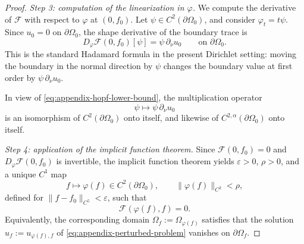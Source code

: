\documentclass[a4paper,11pt,reqno]{amsart}
\numberwithin{equation}{section}
\theoremstyle{plain} %
\theoremstyle{definition} %
\theoremstyle{remark}
\begin{document}
\begin{proof}
\medskip
\noindent\emph{Step 3: computation of the linearization in \(\varphi\).}
We compute the derivative of \(\mathcal F\) with respect to \(\varphi\) at
\((0,f_0)\). Let \(\psi\in C^2(\partial\Omega_0)\), and consider
\(\varphi_t=t\psi\). Since \(u_0=0\) on \(\partial\Omega_0\), the shape derivative
of the boundary trace is
\[
D_\varphi \mathcal F(0,f_0)[\psi]
=
\psi\,\partial_\nu u_0
\qquad \text{on }\partial\Omega_0.
\]
This is the standard Hadamard formula in the present Dirichlet setting: moving
the boundary in the normal direction by \(\psi\) changes the boundary value at
first order by \(\psi\,\partial_\nu u_0\).

In view of \eqref{eq:appendix-hopf-lower-bound}, the multiplication operator
\[
\psi\mapsto \psi\,\partial_\nu u_0
\]
is an isomorphism of \(C^2(\partial\Omega_0)\) onto itself, and likewise of
\(C^{2,\alpha}(\partial\Omega_0)\) onto itself.

\medskip
\noindent\emph{Step 4: application of the implicit function theorem.}
Since \(\mathcal F(0,f_0)=0\) and \(D_\varphi\mathcal F(0,f_0)\) is invertible, the
implicit function theorem yields \(\varepsilon>0\), \(\rho>0\), and a unique \(C^1\)
map
\[
f\mapsto \varphi(f)\in C^2(\partial\Omega_0),
\qquad
\|\varphi(f)\|_{C^2}<\rho,
\]
defined for \(\|f-f_0\|_{C^5}<\varepsilon\), such that
\[
\mathcal F(\varphi(f),f)=0.
\]
Equivalently, the corresponding domain \(\Omega_f:=\Omega_{\varphi(f)}\) satisfies
that the solution \(u_f:=u_{\varphi(f),f}\) of \eqref{eq:appendix-perturbed-problem}
vanishes on \(\partial\Omega_f\).


\end{proof}
\end{document}
